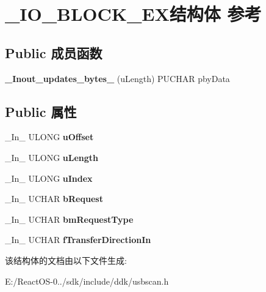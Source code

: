 \hypertarget{struct___i_o___b_l_o_c_k___e_x}{}\section{\+\_\+\+I\+O\+\_\+\+B\+L\+O\+C\+K\+\_\+\+E\+X结构体 参考}
\label{struct___i_o___b_l_o_c_k___e_x}
\subsection*{Public 成员函数}
\begin{DoxyCompactItemize}
\item 
\mbox{\label{struct___i_o___b_l_o_c_k___e_x_a5c8b14411340dbe4805b436b2c4303d5}} 
{\bfseries \+\_\+\+Inout\+\_\+updates\+\_\+bytes\+\_\+} (u\+Length) P\+U\+C\+H\+AR pby\+Data
\end{DoxyCompactItemize}
\subsection*{Public 属性}
\begin{DoxyCompactItemize}
\item 
\mbox{\label{struct___i_o___b_l_o_c_k___e_x_a05bcb8f0e4f834fb540706e3b8a261b2}} 
\+\_\+\+In\+\_\+ U\+L\+O\+NG {\bfseries u\+Offset}
\item 
\mbox{\label{struct___i_o___b_l_o_c_k___e_x_a7ae0984fb8c76465643d8994c52c02bc}} 
\+\_\+\+In\+\_\+ U\+L\+O\+NG {\bfseries u\+Length}
\item 
\mbox{\label{struct___i_o___b_l_o_c_k___e_x_a49e7035d2d8ac5aaed89504b289ff47f}} 
\+\_\+\+In\+\_\+ U\+L\+O\+NG {\bfseries u\+Index}
\item 
\mbox{\label{struct___i_o___b_l_o_c_k___e_x_a588a4e9b915769d0580c767bac2c7bb9}} 
\+\_\+\+In\+\_\+ U\+C\+H\+AR {\bfseries b\+Request}
\item 
\mbox{\label{struct___i_o___b_l_o_c_k___e_x_a81e67500de6e3a221f88a84757c02daa}} 
\+\_\+\+In\+\_\+ U\+C\+H\+AR {\bfseries bm\+Request\+Type}
\item 
\mbox{\label{struct___i_o___b_l_o_c_k___e_x_a41f2f4f2c9ee6a692ed6d0644e59cd9c}} 
\+\_\+\+In\+\_\+ U\+C\+H\+AR {\bfseries f\+Transfer\+Direction\+In}
\end{DoxyCompactItemize}


该结构体的文档由以下文件生成\+:\begin{DoxyCompactItemize}
\item 
E\+:/\+React\+O\+S-\/0../sdk/include/ddk/usbscan.\+h\end{DoxyCompactItemize}
